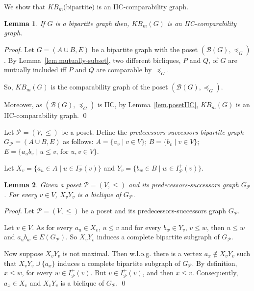 \documentclass{article}
\newcommand{\define}[1]{\emph{#1}}
\newcommand{\mB}{\ensuremath{\mathcal{B}}}
\newcommand{\mP}{\ensuremath{\mathcal{P}}}
\newtheorem{lemma}{Lemma}
\begin{document}
We show that $KB_m($bipartite$)$ is an IIC-comparability graph.

\begin{lemma}\label{lem.KBm-comparability}
  If $G$  is a  bipartite graph then, $KB_m(G)$ is  an IIC-comparability
  graph.
\end{lemma}
\begin{proof}
  Let  $G  =  (A \cup  B,  E)$  be  a  bipartite graph  with  the  poset
  $(\mB(G),   \preceq_G)$.    By  Lemma~\ref{lem.mutually-subset},   two
  different bicliques, $P$ and $Q$, of $G$ are mutually included iff $P$
  and $Q$ are comparable by $\preceq_G$.

  So,   $KB_m(G)$   is   the    comparability   graph   of   the   poset
  $(\mB(G), \preceq_G)$.

  Moreover,     as     $(\mB(G),      \preceq_G)$     is     IIC,     by
  Lemma~\ref{lem.posetIIC}, $KB_m(G)$  is an IIC-com\-pa\-ra\-bi\-li\-ty
  graph.
  \qed
\end{proof}

Let     $\mP    =     (V,\leq)$    be     a    poset.      Define    the
\define{predecessors-successors              bipartite              graph
  $G_{\mP} = (A \cup B, E)$} as follows:
$A = \{ a_v \mid v \in V\}$;
$B = \{ b_v \mid v \in V\}$;
$E = \{ a_ub_v \mid u \leq v$, for $u, v \in V \}$.

Let   $X_v   =   \{a_u   \in   A  \mid   u   \in   I_{\mP}^-(v)\}$   and
$Y_v = \{b_w \in B \mid w \in I_{\mP}^+(v)\}$.

\begin{lemma}\label{lem.XvYv=bicliques}
  Given a  poset $\mP =  (V,\leq)$ and its  predecessors-successors graph
  $G_{\mP}$.  For every $v \in V$, $X_vY_v$ is a biclique of $G_{\mP}$.
\end{lemma}
\begin{proof}
  Let $\mP =  (V,\leq)$ be a poset and  its predecessors-successors graph
  $G_{\mP}$.
  
  Let $v \in V$.  As for every $a_u \in X_v$,
  $u \leq v$  and for every $b_w \in  Y_v$, $v \leq w$, then  $u \leq w$
  and $a_ub_w \in E(G_{\mP})$.  So $X_vY_v$ induces a complete
  bipartite subgraph of $G_{\mP}$.

  Now suppose $X_vY_v$  is not maximal. Then w.l.o.g. there  is a vertex
  $a_x  \not\in  X_vY_v$  such  that $X_vY_v  \cup  \{a_x\}$  induces  a
  complete bipartite subgraph  of $G_{\mP}$. By definition,  $x \leq w$,
  for every  $w \in  I_{\mP}^+(v)$. But $v  \in I_{\mP}^+(v)$,  and then
  $x \leq v$. Consequently, $a_x \in  X_v$ and $X_vY_v$ is a biclique of
  $G_{\mP}$.
  \qed
\end{proof}
\end{document}
